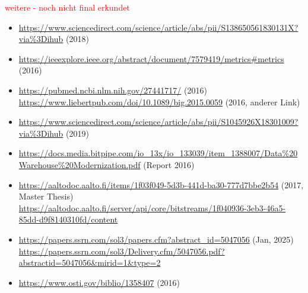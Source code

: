 \noindent
\textcolor{red}{weitere - noch nicht final erkundet}
\begin{itemize}
    \item \url{https://www.sciencedirect.com/science/article/abs/pii/S138650561830131X?via%3Dihub} (2018)
    \item \url{https://ieeexplore.ieee.org/abstract/document/7579419/metrics#metrics} (2016)
    \item \url{https://pubmed.ncbi.nlm.nih.gov/27441717/} (2016)\\
          \url{https://www.liebertpub.com/doi/10.1089/big.2015.0059} (2016, anderer Link)
    \item \url{https://www.sciencedirect.com/science/article/abs/pii/S1045926X18301009?via%3Dihub} (2019)
    \item \url{https://docs.media.bitpipe.com/io_13x/io_133039/item_1388007/Data%20Warehouse%20Modernization.pdf} (Report 2016)
    \item \url{https://aaltodoc.aalto.fi/items/1f03f049-5d3b-441d-ba30-777d7bbe2b54} (2017, Master Thesis)\\
          \url{https://aaltodoc.aalto.fi/server/api/core/bitstreams/1f040936-3eb3-46a5-85dd-d9f8140310fd/content}
    \item \url{https://papers.ssrn.com/sol3/papers.cfm?abstract_id=5047056} (Jan, 2025)\\
          \url{https://papers.ssrn.com/sol3/Delivery.cfm/5047056.pdf?abstractid=5047056&mirid=1&type=2}
    \item \url{https://www.osti.gov/biblio/1358407} (2016)
\end{itemize}
